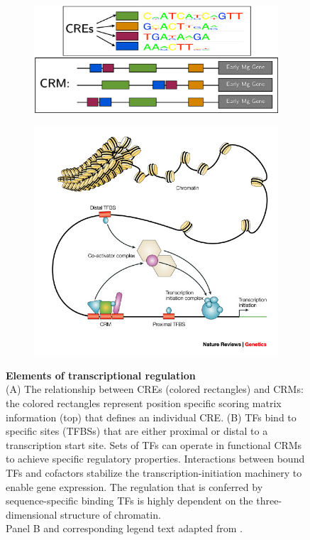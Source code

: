 

\begin{figure}[h]

\begin{subfigure}[b]{.5\linewidth}
\centering 
\includegraphics[width=0.9\linewidth]{figures/figs/CREvCRM.pdf}
\caption{}\label{fig:cre-crm-intro-a}
\end{subfigure}%
\hfil
\begin{subfigure}[b]{.5\linewidth}
\centering
\includegraphics[width=0.9\linewidth]{figures/figs/elementsOfTxReg.jpeg}
\caption{}\label{fig:cre-crm-intro-b}
\end{subfigure}

\caption[Elements of transcriptional regulation]{\sf \textbf{Elements of transcriptional regulation} \\
(A) The relationship between \glspl{CRE} (colored rectangles) and \glspl{CRM}: the colored rectangles represent position specific scoring matrix information (top) that defines an individual \gls{CRE}.
(B) \glspl{TF} bind to specific sites (\glspl{TFBS}) that are either proximal or distal to a transcription start site. Sets of \glspl{TF} can operate in functional \glspl{CRM} to achieve specific regulatory properties. Interactions between bound \glspl{TF} and cofactors stabilize the transcription-initiation machinery to enable gene expression. The regulation that is conferred by sequence-specific binding \glspl{TF} is highly dependent on the three-dimensional structure of chromatin.\\

Panel B and corresponding legend text adapted from \citet{Wasserman2004}.
}\label{fig:cre-crm-intro}
\end{figure}